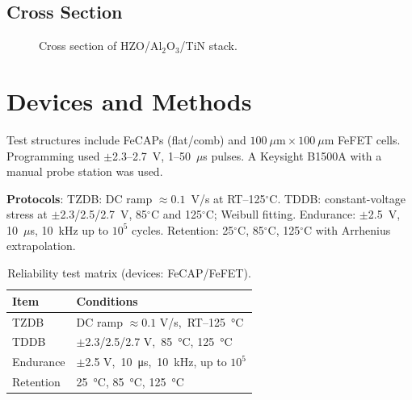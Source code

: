 \documentclass[conference]{IEEEtran}
\begin{document}
\subsection{Cross Section}
\begin{figure}[!t]
  \centering
  \caption{Cross section of HZO/Al$_2$O$_3$/TiN stack.}
  \label{fig:stack}
\end{figure}

\section{Devices and Methods}
Test structures include FeCAPs (flat/comb) and $100~\mu\mathrm{m}\times100~\mu\mathrm{m}$ FeFET cells.
Programming used $\pm$2.3--2.7~V, 1--50~$\mu$s pulses.
A Keysight B1500A with a manual probe station was used.

\textbf{Protocols}: 
TZDB: DC ramp $\approx 0.1$~V/s at RT--125$^\circ$C.
TDDB: constant-voltage stress at $\pm$2.3/2.5/2.7~V, 85$^\circ$C and 125$^\circ$C; Weibull fitting.
Endurance: $\pm$2.5~V, 10~$\mu$s, 10~kHz up to $10^5$ cycles.
Retention: 25$^\circ$C, 85$^\circ$C, 125$^\circ$C with Arrhenius extrapolation.

\begin{table}[!t]
  \centering
  \caption{Reliability test matrix (devices: FeCAP/FeFET).}
  \label{tab:test-matrix}
  \begin{tabular}{@{}ll@{}}
    \toprule
    \textbf{Item} & \textbf{Conditions} \\
    \midrule
    TZDB     & DC ramp $\approx 0.1$ V/s,\ RT--\SI{125}{\celsius} \\
    TDDB     & $\pm$2.3/2.5/2.7 V,\ \SI{85}{\celsius}, \SI{125}{\celsius} \\
    Endurance& $\pm$2.5 V,\ \SI{10}{\micro\second},\ \SI{10}{\kilo\hertz}, up to $10^5$ \\
    Retention& \SI{25}{\celsius}, \SI{85}{\celsius}, \SI{125}{\celsius} \\
    \bottomrule
  \end{tabular}
\end{table}
\end{document}

